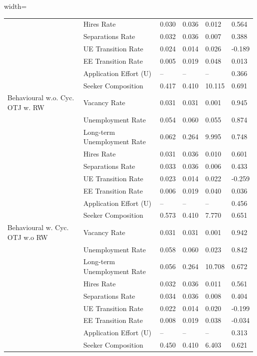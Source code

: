 \begin{table}[ht]
\begin{adjustbox}{width=\textwidth}
\begin{tabular}{llllll}
 & Hires Rate & 0.030 & 0.036 & 0.012 & 0.564 \\
 & Separations Rate & 0.032 & 0.036 & 0.007 & 0.388 \\
 & UE Transition Rate & 0.024 & 0.014 & 0.026 & \cellcolor{red!25}-0.189 \\
 & EE Transition Rate & 0.005 & 0.019 & 0.048 & 0.013 \\
 & Application Effort (U) & -- & -- & -- & 0.366 \\
 & Seeker Composition & 0.417 & 0.410 & 10.115 & \cellcolor{yellow!25}0.691 \\
Behavioural w.o. Cyc. OTJ w. RW & Vacancy Rate & 0.031 & 0.031 & \cellcolor{yellow!25}0.001 & \cellcolor{yellow!25}0.945 \\
 & Unemployment Rate & 0.054 & 0.060 & 0.055 & \cellcolor{black!30}0.874 \\
 & Long-term Unemployment Rate & 0.062 & 0.264 & 9.995 & 0.748 \\
 & Hires Rate & 0.031 & 0.036 & \cellcolor{red!25}0.010 & \cellcolor{yellow!25}0.601 \\
 & Separations Rate & 0.033 & 0.036 & \cellcolor{red!25}0.006 & \cellcolor{red!25}0.433 \\
 & UE Transition Rate & 0.023 & 0.014 & 0.022 & -0.259 \\
 & EE Transition Rate & 0.006 & 0.019 & 0.040 & \cellcolor{red!25}0.036 \\
 & Application Effort (U) & -- & -- & -- & 0.456 \\
 & Seeker Composition & 0.573 & 0.410 & 7.770 & 0.651 \\
Behavioural w. Cyc. OTJ w.o RW & Vacancy Rate & 0.031 & 0.031 & \cellcolor{yellow!25}0.001 & \cellcolor{yellow!25}0.942 \\
 & Unemployment Rate & 0.058 & 0.060 & \cellcolor{black!15}0.023 & 0.842 \\
 & Long-term Unemployment Rate & 0.056 & 0.264 & 10.708 & 0.672 \\
 & Hires Rate & 0.032 & 0.036 & 0.011 & 0.561 \\
 & Separations Rate & 0.034 & 0.036 & 0.008 & 0.404 \\
 & UE Transition Rate & 0.022 & 0.014 & 0.020 & -0.199 \\
 & EE Transition Rate & 0.008 & 0.019 & 0.038 & -0.034 \\
 & Application Effort (U) & -- & -- & -- & 0.313 \\
 & Seeker Composition & 0.450 & 0.410 & 6.403 & 0.621 \\

\end{tabular}
\end{adjustbox}
\end{table}
